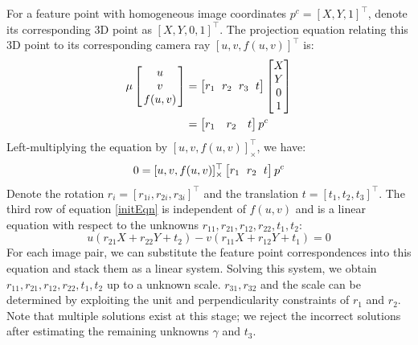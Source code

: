 \documentclass{report}
\begin{document}
For a feature point with homogeneous image coordinates $p^c = [X, Y, 1]^\top$, denote its corresponding 3D point as $[X, Y, 0, 1]^\top$. The projection equation relating this 3D point to its corresponding camera ray $[u, v, f(u, v)]^\top$ is: 
\begin{align}
\arraycolsep=1.5pt%
\mu \begin{bmatrix}
	\begin{array}{c}
	u \\ v \\ f(u, v)
	\end{array}
\end{bmatrix}
&=
\arraycolsep=1.5pt%
\begin{bmatrix}
	r_1 && r_2 && r_3 && t
\end{bmatrix}
\begin{bmatrix}
	X \\ Y \\ 0 \\ 1
\end{bmatrix}\\
&= \begin{bmatrix}
	r_1 & r_2 & t
	\end{bmatrix} p^c
\end{align}
Left-multiplying the equation by $[u, v, f(u, v)]^\top_\times$, we have: 
\begin{equation}
\arraycolsep=1.5pt%
0 = [u, v, f(u, v)]^\top_\times
\begin{bmatrix}
	r_1 && r_2 && t
\end{bmatrix} p^c
\label{initEqn}
\end{equation}
Denote the rotation $r_i = [r_{1i}, r_{2i}, r_{3i}]^\top$ and the translation $t = [t_1, t_2, t_3]^\top$. The third row of equation \ref{initEqn} is independent of $f(u, v)$ and is a linear equation with respect to the unknowns $r_{11}, r_{21}, r_{12}, r_{22}, t_1, t_2$:
\begin{equation}
u (r_{21} X + r_{22} Y + t_2) - v (r_{11} X + r_{12} Y + t_1) = 0
\end{equation}
For each image pair, we can substitute the feature point correspondences into this equation and stack them as a linear system. Solving this system, we obtain $r_{11}, r_{21}, r_{12}, r_{22}, t_1, t_2$ up to a unknown scale. $r_{31}, r_{32}$ and the scale can be determined by exploiting the unit and perpendicularity constraints of $r_1$ and $r_2$. Note that multiple solutions exist at this stage; we reject the incorrect solutions after estimating the remaining unknowns $\gamma$ and $t_3$. 
\end{document}
